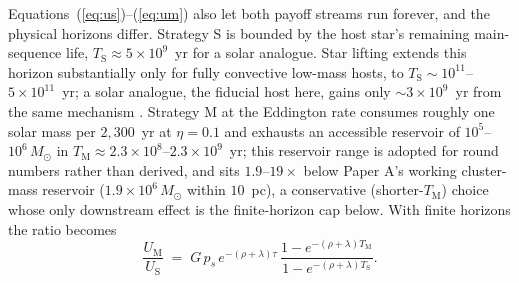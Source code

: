 \documentclass[11pt]{article}
\newcommand{\msun}{\ensuremath{M_\odot}}
\begin{document}
Equations~(\ref{eq:us})--(\ref{eq:um}) also let both payoff streams run forever, and the physical horizons differ. Strategy S is bounded by the host star's remaining main-sequence life, $T_{\mathrm S} \approx 5\times10^{9}$~yr for a solar analogue. Star lifting extends this horizon substantially only for fully convective low-mass hosts, to $T_{\mathrm S} \sim 10^{11}$--$5\times10^{11}$~yr; a solar analogue, the fiducial host here, gains only $\sim3\times10^{9}$~yr from the same mechanism \citep{ScogginsKipping2023}. Strategy M at the Eddington rate consumes roughly one solar mass per $2{,}300$~yr at $\eta = 0.1$ and exhausts an accessible reservoir of $10^{5}$--$10^{6}\,\msun$ in $T_{\mathrm M} \approx 2.3\times10^{8}$--$2.3\times10^{9}$~yr; this reservoir range is adopted for round numbers rather than derived, and sits $1.9$--$19\times$ below Paper A's working cluster-mass reservoir ($1.9\times10^{6}\,\msun$ within $10$~pc), a conservative (shorter-$T_{\mathrm M}$) choice whose only downstream effect is the finite-horizon cap below. With finite horizons the ratio becomes
\begin{equation}
\frac{U_{\mathrm M}}{U_{\mathrm S}} \;=\; G\, p_{s}\, e^{-(\rho+\lambda)\tau}\, \frac{1 - e^{-(\rho+\lambda)T_{\mathrm M}}}{1 - e^{-(\rho+\lambda)T_{\mathrm S}}}.
\label{eq:finitehorizon}
\end{equation}
\end{document}
